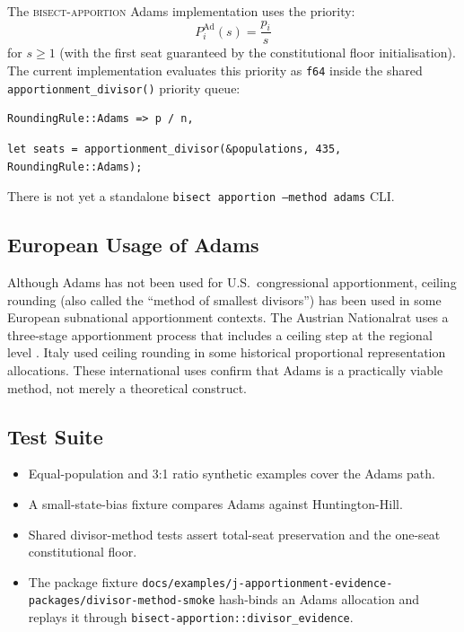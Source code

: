 \label{sec:implementation}

The \textsc{bisect-apportion} Adams implementation uses the priority:
\[
  P_i^{\text{Ad}}(s) = \frac{p_i}{s}
\]
for $s \geq 1$ (with the first seat guaranteed by the constitutional
floor initialisation).
The current implementation evaluates this priority as \texttt{f64} inside the
shared \texttt{apportionment\_divisor()} priority queue:

\begin{verbatim}
RoundingRule::Adams => p / n,
\end{verbatim}

\begin{verbatim}
let seats = apportionment_divisor(&populations, 435, RoundingRule::Adams);
\end{verbatim}

There is not yet a standalone \texttt{bisect apportion --method adams} CLI.

\subsection{European Usage of Adams}

Although Adams has not been used for U.S.\ congressional apportionment,
ceiling rounding (also called the ``method of smallest divisors'')
has been used in some European subnational apportionment contexts.
The Austrian Nationalrat uses a three-stage apportionment process
that includes a ceiling step at the regional level \citep{lijphart1994electoral}.
Italy used ceiling rounding in some historical proportional
representation allocations.
These international uses confirm that Adams is a practically viable
method, not merely a theoretical construct.

\subsection{Test Suite}

\begin{itemize}
  \item Equal-population and 3:1 ratio synthetic examples cover the Adams path.
  \item A small-state-bias fixture compares Adams against Huntington-Hill.
  \item Shared divisor-method tests assert total-seat preservation and the
    one-seat constitutional floor.
  \item The package fixture
    \texttt{docs/examples/j-apportionment-evidence-packages/divisor-method-smoke}
    hash-binds an Adams allocation and replays it through
    \texttt{bisect-apportion::divisor\_evidence}.
\end{itemize}
